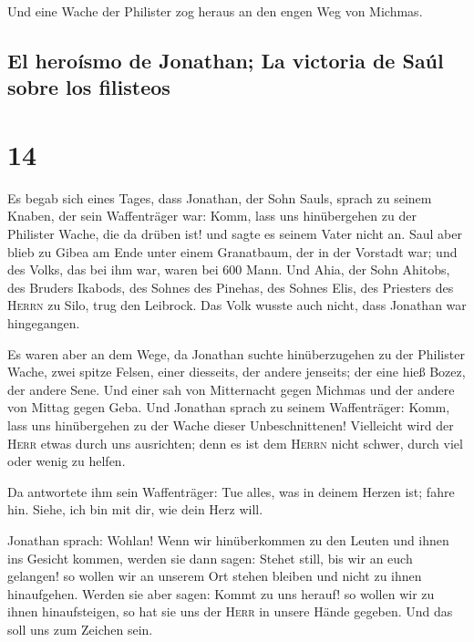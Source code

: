  Und eine Wache der Philister zog heraus an den engen Weg
von Michmas.

\hypertarget{el-herouxedsmo-de-jonathan-la-victoria-de-sauxfal-sobre-los-filisteos}{%
\subsection{El heroísmo de Jonathan; La victoria de Saúl sobre los
filisteos}\label{el-herouxedsmo-de-jonathan-la-victoria-de-sauxfal-sobre-los-filisteos}}

\hypertarget{section-13}{%
\section{14}\label{section-13}}

 Es begab sich eines Tages, dass Jonathan, der Sohn Sauls,
sprach zu seinem Knaben, der sein Waffenträger war: Komm, lass uns
hinübergehen zu der Philister Wache, die da drüben ist! und sagte es
seinem Vater nicht an.  Saul aber blieb zu Gibea am Ende
unter einem Granatbaum, der in der Vorstadt war; und des Volks, das bei
ihm war, waren bei 600 Mann.  Und Ahia, der Sohn Ahitobs,
des Bruders Ikabods, des Sohnes des Pinehas, des Sohnes Elis, des
Priesters des \textsc{Herrn} zu Silo, trug den Leibrock. Das Volk wusste
auch nicht, dass Jonathan war hingegangen.

 Es waren aber an dem Wege, da Jonathan suchte
hinüberzugehen zu der Philister Wache, zwei spitze Felsen, einer
diesseits, der andere jenseits; der eine hieß Bozez, der andere Sene.
 Und einer sah von Mitternacht gegen Michmas und der
andere von Mittag gegen Geba.  Und Jonathan sprach zu
seinem Waffenträger: Komm, lass uns hinübergehen zu der Wache dieser
Unbeschnittenen! Vielleicht wird der \textsc{Herr} etwas durch uns
ausrichten; denn es ist dem \textsc{Herrn} nicht schwer, durch viel oder
wenig zu helfen.

 Da antwortete ihm sein Waffenträger: Tue alles, was in
deinem Herzen ist; fahre hin. Siehe, ich bin mit dir, wie dein Herz
will.

 Jonathan sprach: Wohlan! Wenn wir hinüberkommen zu den
Leuten und ihnen ins Gesicht kommen,  werden sie dann
sagen: Stehet still, bis wir an euch gelangen! so wollen wir an unserem
Ort stehen bleiben und nicht zu ihnen hinaufgehen. 
Werden sie aber sagen: Kommt zu uns herauf! so wollen wir zu ihnen
hinaufsteigen, so hat sie uns der \textsc{Herr} in unsere Hände gegeben.
Und das soll uns zum Zeichen sein.

